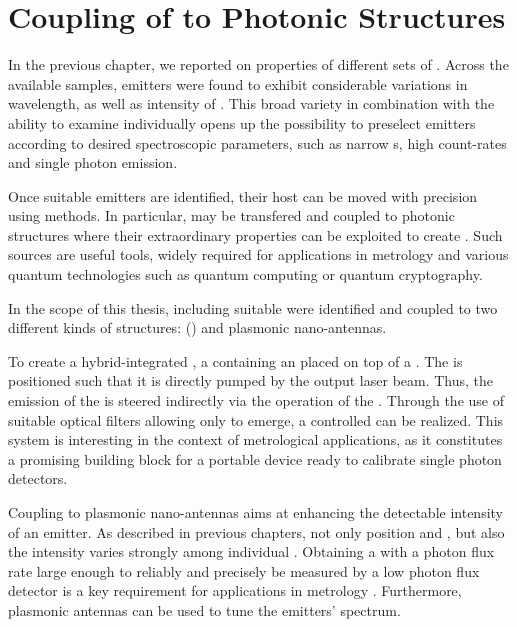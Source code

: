 
\chapter{Coupling of \Nds to Photonic Structures}	\label{ch::coupling}

	In the previous chapter, we reported on \pl properties of different sets of \sivs.
	Across the available samples, emitters were found to exhibit considerable variations in wavelength, \lw as well as intensity of \zpls.
	This broad variety in combination with the ability to examine \sivs individually opens up the possibility to preselect emitters according to desired spectroscopic parameters, such as narrow \lw{}s, high count-rates and single photon emission.

	Once suitable emitters are identified, their host \nds can be moved with precision using \pp methods.
	In particular, \sivs may be transfered and coupled to photonic structures where their extraordinary properties can be exploited to create \sps.
	Such sources are useful tools, widely required for applications in metrology and various quantum technologies such as quantum computing or quantum cryptography.

	In the scope of this thesis, \nds including suitable \sivs were identified and coupled to two different kinds of structures: \Vcsels (\VCSELs) and plasmonic nano-antennas.

	To create a hybrid-integrated \sps, a \nd containing an \siv placed on top of a \VCSEL. The \siv is positioned such that it is directly pumped by the \VCSEL output laser beam. Thus, the emission of the \siv is steered indirectly via the operation of the \VCSEL. Through the use of suitable optical filters allowing only \siv \fl to emerge, a controlled \sps can be realized. This system is interesting in the context of metrological applications, as it constitutes a promising building block for a portable device ready to calibrate single photon detectors.

	Coupling \sivs to plasmonic nano-antennas aims at enhancing the detectable \pl intensity of an emitter.
	As described in previous chapters, not only \ZPL position and \lw, but also the \pl intensity varies strongly among individual \sivs.
	Obtaining a \sps with a photon flux rate large enough to reliably and precisely be measured by a low photon flux detector is a key requirement for applications in metrology \cite{Vaigu2017}.
	Furthermore, plasmonic antennas can be used to tune the emitters' \pl spectrum.



